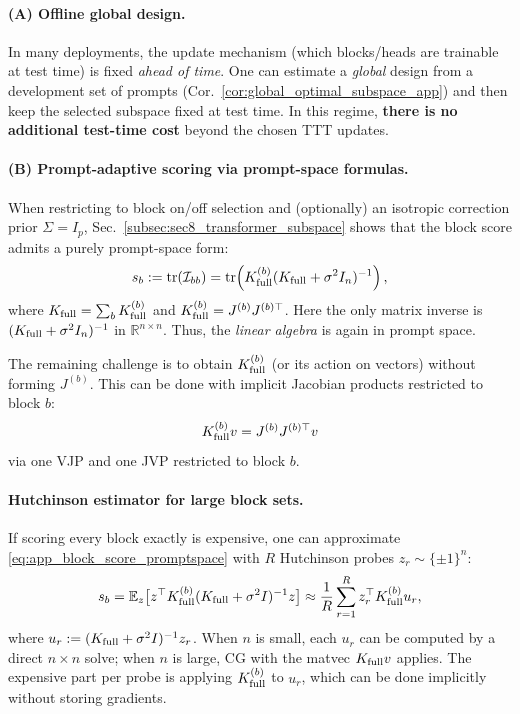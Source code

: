 \documentclass{article}
\theoremstyle{plain}
\theoremstyle{definition}
\theoremstyle{remark}
\begin{document}
\paragraph{(A) Offline global design.}
In many deployments, the update mechanism (which blocks/heads are trainable at test time) is fixed \emph{ahead of time}.
One can estimate a \emph{global} design from a development set of prompts (Cor.~\ref{cor:global_optimal_subspace_app})
and then keep the selected subspace fixed at test time.
In this regime, \textbf{there is no additional test-time cost} beyond the chosen TTT updates.

\paragraph{(B) Prompt-adaptive scoring via prompt-space formulas.}
When restricting to block on/off selection and (optionally) an isotropic correction prior $\Sigma=I_p$, Sec.~\ref{subsec:sec8_transformer_subspace} shows that the block score admits a purely prompt-space form:
\begin{equation}
s_b
:=\mathrm{tr}(\mathcal I_{bb})
=\mathrm{tr}\!\left(K_{\rm full}^{(b)}(K_{\rm full}+\sigma^2 I_n)^{-1}\right),
\label{eq:app_block_score_promptspace}
\end{equation}
where $K_{\rm full}=\sum_{b}K_{\rm full}^{(b)}$ and $K_{\rm full}^{(b)}=J^{(b)}J^{(b)\top}$. Here the only matrix inverse is $(K_{\rm full}+\sigma^2 I_n)^{-1}$ in $\mathbb{R}^{n\times n}$.
Thus, the \emph{linear algebra} is again in prompt space.

The remaining challenge is to obtain $K_{\rm full}^{(b)}$ (or its action on vectors) without forming $J^{(b)}$.
This can be done with implicit Jacobian products restricted to block $b$:
\[
K_{\rm full}^{(b)} v
= J^{(b)}J^{(b)\top} v
\]
via one VJP and one JVP restricted to block $b$.

\paragraph{Hutchinson estimator for large block sets.}
If scoring every block exactly is expensive, one can approximate \eqref{eq:app_block_score_promptspace} with
$R$ Hutchinson probes $z_r\sim\{\pm1\}^n$:
\begin{equation}
s_b
=\mathbb{E}_{z}\big[z^\top K_{\rm full}^{(b)}(K_{\rm full}+\sigma^2 I)^{-1}z\big]
\approx \frac{1}{R}\sum_{r=1}^R z_r^\top K_{\rm full}^{(b)}u_r,
\label{eq:app_hutchinson_block_score}
\end{equation}
where $u_r:=(K_{\rm full}+\sigma^2 I)^{-1}z_r$.
When $n$ is small, each $u_r$ can be computed by a direct $n\times n$ solve; when $n$ is large, CG with the matvec
$K_{\rm full}v$ applies. The expensive part per probe is applying $K_{\rm full}^{(b)}$ to $u_r$, which can be done
implicitly without storing gradients.
\end{document}
